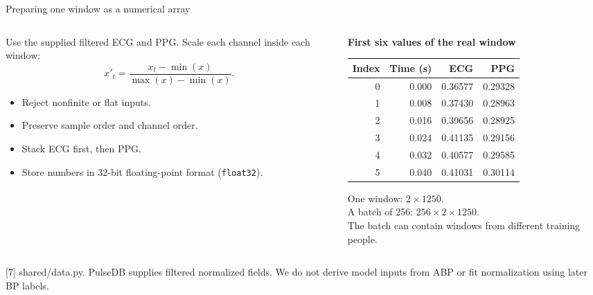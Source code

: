 \documentclass[aspectratio=169,11pt]{beamer}
\newcommand{\source}[1]{\vfill\par{\fontsize{7}{8}\selectfont\color{Muted}#1}}
\newcommand{\smalltable}{\fontsize{9}{11}\selectfont\renewcommand{\arraystretch}{1.18}}
\begin{document}
\begin{frame}{Preparing one window as a numerical array}
\begin{columns}[T]
\begin{column}{.52\textwidth}
Use the supplied filtered ECG and PPG. Scale each channel inside each window:
\[x'_t=\frac{x_t-\min(x)}{\max(x)-\min(x)}.\]
\begin{itemize}\setlength\itemsep{2mm}
\item Reject nonfinite or flat inputs.
\item Preserve sample order and channel order.
\item Stack ECG first, then PPG.
\item Store numbers in 32-bit floating-point format (\texttt{float32}).
\end{itemize}
\end{column}
\begin{column}{.44\textwidth}
\textbf{First six values of the real window}\par\medskip
\smalltable\begin{tabular}{rrrr}\toprule
Index & Time (s) & ECG & PPG\\\midrule
0 & 0.000 & 0.36577 & 0.29328\\
1 & 0.008 & 0.37430 & 0.28963\\
2 & 0.016 & 0.39656 & 0.28925\\
3 & 0.024 & 0.41135 & 0.29156\\
4 & 0.032 & 0.40577 & 0.29585\\
5 & 0.040 & 0.41031 & 0.30114\\
\bottomrule\end{tabular}
\par\medskip\small One window: $2\times1250$.\\A batch of 256: $256\times2\times1250$.\\The batch can contain windows from different training people.
\end{column}
\end{columns}
\source{[7] shared/data.py. PulseDB supplies filtered normalized fields. We do not derive model inputs from ABP or fit normalization using later BP labels.}
\end{frame}
\end{document}
